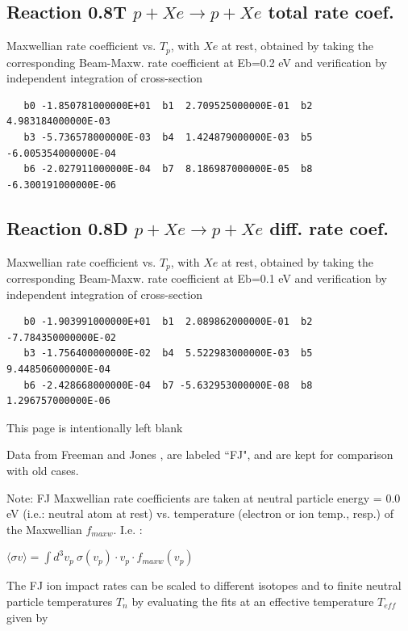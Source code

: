 \documentclass[12pt,dvipdfmx]{article}
\begin{document}
\subsection{
Reaction 0.8T  $p + Xe \rightarrow p + Xe$ total rate coef.
}
Maxwellian rate coefficient vs. $T_{p}$, with $Xe$ at rest, obtained by taking
the corresponding Beam-Maxw. rate coefficient at Eb=0.2 eV and
verification by independent integration of cross-section
\begin{small}\begin{verbatim}
   b0 -1.850781000000E+01  b1  2.709525000000E-01  b2  4.983184000000E-03
   b3 -5.736578000000E-03  b4  1.424879000000E-03  b5 -6.005354000000E-04
   b6 -2.027911000000E-04  b7  8.186987000000E-05  b8 -6.300191000000E-06
\end{verbatim}\end{small}


\subsection{
Reaction 0.8D  $p + Xe \rightarrow p + Xe$ diff. rate coef.
}
Maxwellian rate coefficient vs. $T_{p}$, with $Xe$ at rest, obtained by taking
the corresponding Beam-Maxw. rate coefficient at Eb=0.1 eV and
verification by independent integration of cross-section
\begin{small}\begin{verbatim}
   b0 -1.903991000000E+01  b1  2.089862000000E-01  b2 -7.784350000000E-02
   b3 -1.756400000000E-02  b4  5.522983000000E-03  b5  9.448506000000E-04
   b6 -2.428668000000E-04  b7 -5.632953000000E-08  b8  1.296757000000E-06
\end{verbatim}\end{small}



\newpage
This page is intentionally left blank
\newpage


Data from Freeman and Jones \cite{kn:Freeman},
are labeled ``FJ", and are kept for comparison with old cases.

Note: FJ Maxwellian rate coefficients are taken at neutral particle energy = 0.0 eV
(i.e.: neutral atom at rest) vs. temperature (electron or ion temp., resp.) of the Maxwellian $f_{maxw}$.
I.e. :

$\langle\sigma v \rangle = \int d^3v_p \ \sigma(v_{p}) \cdot v_{p} \cdot
f_{maxw}(v_{p})$

The FJ ion impact rates can be scaled to different isotopes and to finite
neutral particle temperatures $T_n$ by evaluating the fits at an
effective temperature $T_{eff}$ given by
\end{document}

